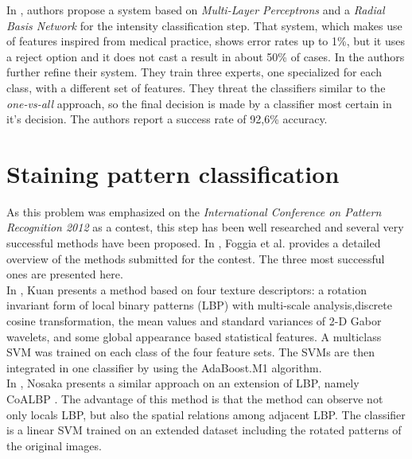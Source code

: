 In \cite{SodaIntensity2006},  authors propose a system based on  \textit{Multi-Layer Perceptrons} and a \textit{Radial Basis Network} for the intensity classification step. That system, which makes use of features inspired from medical practice, shows error rates  up to 1\%, but it uses a reject option and it does not cast a result in about 50\% of cases. In \cite{SodaIntensity2009} the authors further refine their system. They train three experts, one specialized for each class, with a different set of features. They threat the classifiers similar to the \textit{one-vs-all} approach, so the final decision is made by a classifier most certain in it's decision. The authors report a success rate of 92,6\% accuracy. \\



\section{Staining pattern classification}

As this problem was emphasized on the \textit{International Conference on Pattern Recognition 2012} as a contest, this step has been well researched and several very successful methods have been proposed. In \cite{FoggiaBenchmarks2013}, Foggia et al. provides a detailed overview of the methods submitted for the contest. The three most successful ones are presented here.  \\

In \cite{Kuan2012}, Kuan presents a method based on four texture descriptors: a rotation invariant form of local binary patterns (LBP) with multi-scale analysis,discrete cosine transformation, the mean values and standard variances of 2-D Gabor wavelets, and some global appearance based statistical features. A multiclass SVM was trained on each class of the four feature sets. The SVMs are then integrated in one classifier by using the AdaBoost.M1 algorithm. \\

In \cite{Nosaka2012}, Nosaka presents a similar approach on an extension of LBP, namely CoALBP \cite{Nosaka2011}. The advantage of this method is that the method can observe not only locals LBP, but also the spatial relations among adjacent LBP. The classifier is a linear SVM trained on an extended dataset including the rotated patterns of the original images. \\

